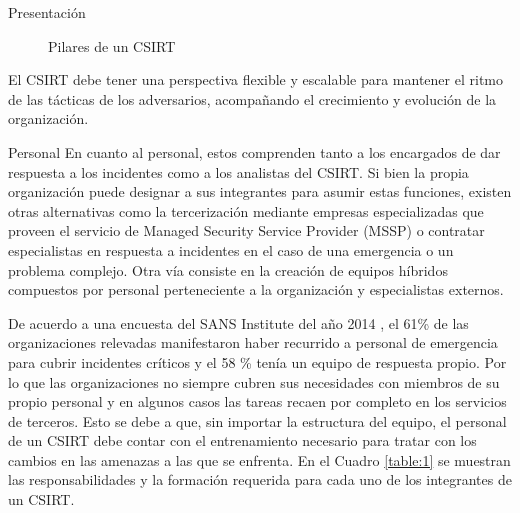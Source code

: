 \begin{section}{Presentación}
\begin{figure}[H]
            \caption{Pilares de un CSIRT}
            \label{fig:pilares}
        \end{figure}
        El CSIRT debe tener una perspectiva flexible y escalable para mantener el ritmo de las tácticas de los adversarios, acompañando el crecimiento y evolución de la organización. \par
    \end{section}
    
   \begin{section}{Personal}  
   En cuanto al personal, estos comprenden tanto a los encargados de dar respuesta a los incidentes como a los analistas del CSIRT. Si bien la propia organización puede designar a sus integrantes para asumir estas funciones, existen otras alternativas como la tercerización mediante empresas especializadas que proveen el servicio de Managed Security Service Provider (MSSP) o contratar especialistas en respuesta a incidentes en el caso de una emergencia o un problema complejo. Otra vía consiste en la creación de equipos híbridos compuestos por personal perteneciente a la organización y especialistas externos. \par
    De acuerdo a una encuesta del SANS Institute del año 2014 \cite{sans_1}, el 61\% de las organizaciones relevadas manifestaron haber recurrido a personal de emergencia para cubrir incidentes críticos y el 58 \% tenía un equipo de respuesta propio. Por lo que las organizaciones no siempre cubren sus necesidades con miembros de su propio personal y en algunos casos las tareas recaen por completo en los servicios de terceros. Esto se debe a que, sin importar la estructura del equipo, el personal de un CSIRT debe contar con el entrenamiento necesario para tratar con los cambios en las amenazas a las que se enfrenta. En el Cuadro \ref{table:1} se muestran las responsabilidades y la formación requerida para cada uno de los integrantes de un CSIRT. \par
    

\end{section}
